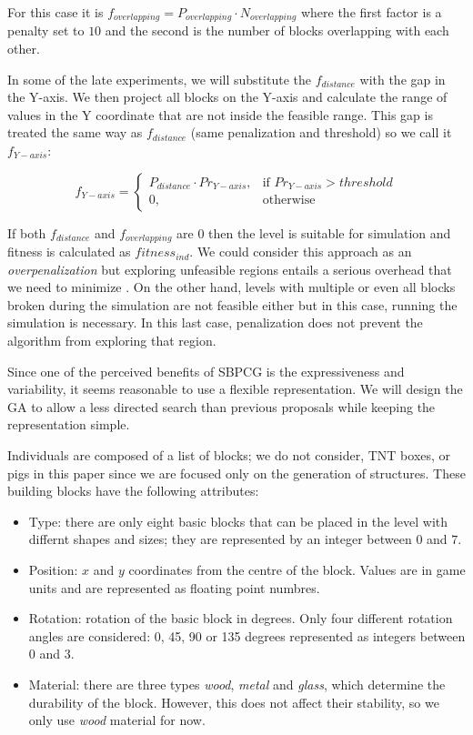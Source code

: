 \documentclass[a4paper,twoside]{article}
\begin{document}
For this case it is $f_{overlapping} = P_{overlapping} \cdot N_{overlapping}$ where the first factor is a penalty set to $10$ and the second is the number of  blocks overlapping with each other. 

In some of the late experiments, we will substitute the $f_{distance}$ with the gap in the Y-axis.  We then project all blocks on the Y-axis and calculate the range of values in the Y coordinate that are not inside the feasible range. This gap is treated the same way as $f_{distance}$
(same penalization and threshold) so we call it $f_{Y-axis}$:

$$f_{Y-axis} = 
\begin{cases}
P_{distance}\cdot Pr_{Y-axis}, & \text{if } Pr_{Y-axis} > threshold\\
0, & \text{otherwise}
\end{cases}
$$

If both $f_{distance}$ and $f_{overlapping}$ are $0$ then the level is suitable for simulation and fitness is calculated as $fitness_{ind}$. We  could consider this approach as an \textit{overpenalization} but exploring unfeasible regions entails a serious overhead that we need to minimize \cite{runarsson2003evolutionary}. On the other hand, levels with multiple or even all blocks broken during the simulation are not feasible either but in this case, running the simulation is necessary. In this last case, penalization does not prevent the algorithm from exploring that region.

Since one of the perceived benefits of SBPCG is the expressiveness and variability, it seems reasonable to use a flexible representation. We will design the GA to allow a less directed search than previous proposals while keeping the representation simple.

Individuals are composed of a list of blocks; we do not consider, TNT boxes, or pigs in this paper since we are focused only on the generation of structures. These building blocks have the following attributes:

\begin{itemize}
	\item Type: there are only eight basic blocks that can be placed in the level 
	with differnt shapes and sizes; they are represented by an 
        integer between $0$ and $7$.
	\item Position: $x$ and $y$  coordinates from the centre of the block. Values are in game 
	units and are represented as floating point numbres.
	\item Rotation: rotation of the basic block in degrees. Only four different 
	rotation angles are considered: 0, 45, 90 or 135 degrees represented as integers 
	between $0$ and $3$.
	\item Material: there are three types \textit{wood}, \textit{metal} and \textit{glass}, which determine the durability of the block.
	However, this does not affect their stability, so we only use \textit{wood} material for now.
\end{itemize}
\end{document}
